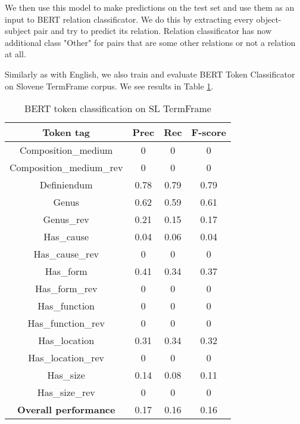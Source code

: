 \documentclass[fleqn,moreauthors,10pt]{ds_report}
\begin{document}
\par We then use this model to make predictions on the test set and use them as an input to BERT relation classificator. We do this by extracting every object-subject pair and try to predict its relation. Relation classificator has now additional class "Other" for pairs that are some other relations or not a relation at all.

\par Similarly as with English, we also train and evaluate BERT Token Classificator on Slovene TermFrame corpus. We see results in Table \ref{tab:tagger_all_slo}.

\begin{table}[!ht]
    \centering
    \begin{tabular}{|c|c|c|c|}
        \hline
        \textbf{Token tag} & \textbf{Prec} & \textbf{Rec} & \textbf{F-score} \\ \hline \hline
        Composition\_medium  &  0  &  0  &  0 \\ \hline
        Composition\_medium\_rev  &  0  &  0  &  0 \\ \hline
        Definiendum               &  0.78  &  0.79  &  0.79 \\ \hline
        Genus               &  0.62  &  0.59  &  0.61 \\ \hline
        Genus\_rev               &  0.21  &  0.15  &  0.17 \\ \hline
        Has\_cause           &  0.04  &  0.06  &  0.04 \\ \hline
        Has\_cause\_rev           &  0  &  0  &  0 \\ \hline
        Has\_form           &  0.41  &  0.34  &  0.37 \\ \hline
        Has\_form\_rev           &  0  &  0  &  0 \\ \hline
        Has\_function        & 0  &   0  &  0 \\ \hline
        Has\_function\_rev        & 0  &   0  &  0 \\ \hline
        Has\_location        &  0.31  &  0.34  &  0.32 \\ \hline
        Has\_location\_rev        &  0  &  0  &  0 \\ \hline
        Has\_size            & 0.14 &  0.08  &  0.11 \\ \hline \hline
        Has\_size\_rev            & 0 &  0  &  0 \\ \hline \hline
        \textbf{Overall performance} & 0.17 & 0.16 & 0.16 \\ \hline
    \end{tabular}
    \caption{BERT token classification on SL TermFrame}
    \label{tab:tagger_all_slo}
\end{table}
\end{document}
